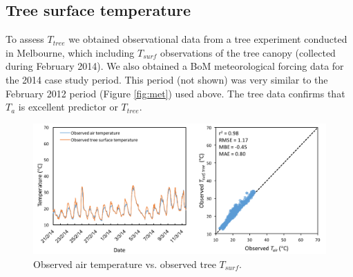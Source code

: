 \documentclass[journal abbreviation, manuscript]{copernicus}
\begin{document}
\subsection{Tree surface temperature}\label{app:tree_surf}  

To assess $T_{tree}$ we obtained observational data from a tree experiment conducted in Melbourne, which including $T_{surf}$ observations of the tree canopy (collected during February 2014). We also obtained a BoM meteorological forcing data for the 2014 case study period.  This period (not shown) was very similar to the February 2012 period (Figure \ref{fig:met}) used above. The tree data confirms that \ensuremath{T_{a}} is excellent predictor or $T_{tree}$. 

\begin{figure}
\begin{center}
\end{center}
\includegraphics[width=1\textwidth,keepaspectratio]{figure13.png}
 \caption{Observed air temperature vs. observed tree $T_{surf}$.} \label{fig:TreeTsurfvsTair}
\end{figure}
\end{document}
